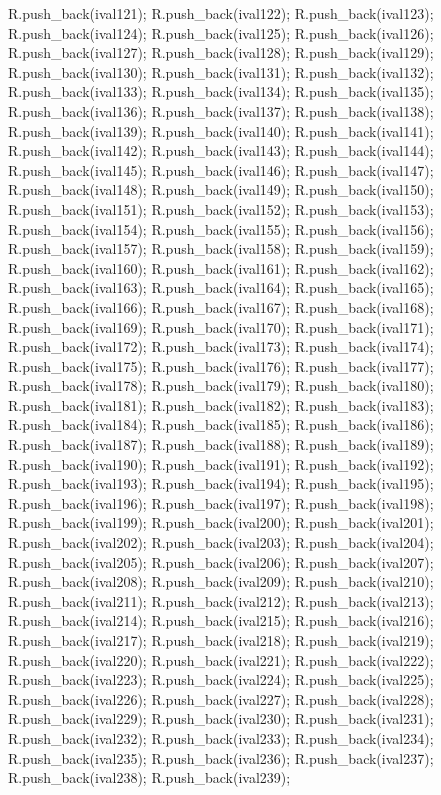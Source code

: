 \begin{DoxyCode}
{R.push_back(ival121);
R.push_back(ival122);
R.push_back(ival123);
R.push_back(ival124);
R.push_back(ival125);
R.push_back(ival126);
R.push_back(ival127);
R.push_back(ival128);
R.push_back(ival129);
R.push_back(ival130);
R.push_back(ival131);
R.push_back(ival132);
R.push_back(ival133);
R.push_back(ival134);
R.push_back(ival135);
R.push_back(ival136);
R.push_back(ival137);
R.push_back(ival138);
R.push_back(ival139);
R.push_back(ival140);
R.push_back(ival141);
R.push_back(ival142);
R.push_back(ival143);
R.push_back(ival144);
R.push_back(ival145);
R.push_back(ival146);
R.push_back(ival147);
R.push_back(ival148);
R.push_back(ival149);
R.push_back(ival150);
R.push_back(ival151);
R.push_back(ival152);
R.push_back(ival153);
R.push_back(ival154);
R.push_back(ival155);
R.push_back(ival156);
R.push_back(ival157);
R.push_back(ival158);
R.push_back(ival159);
R.push_back(ival160);
R.push_back(ival161);
R.push_back(ival162);
R.push_back(ival163);
R.push_back(ival164);
R.push_back(ival165);
R.push_back(ival166);
R.push_back(ival167);
R.push_back(ival168);
R.push_back(ival169);
R.push_back(ival170);
R.push_back(ival171);
R.push_back(ival172);
R.push_back(ival173);
R.push_back(ival174);
R.push_back(ival175);
R.push_back(ival176);
R.push_back(ival177);
R.push_back(ival178);
R.push_back(ival179);
R.push_back(ival180);
R.push_back(ival181);
R.push_back(ival182);
R.push_back(ival183);
R.push_back(ival184);
R.push_back(ival185);
R.push_back(ival186);
R.push_back(ival187);
R.push_back(ival188);
R.push_back(ival189);
R.push_back(ival190);
R.push_back(ival191);
R.push_back(ival192);
R.push_back(ival193);
R.push_back(ival194);
R.push_back(ival195);
R.push_back(ival196);
R.push_back(ival197);
R.push_back(ival198);
R.push_back(ival199);
R.push_back(ival200);
R.push_back(ival201);
R.push_back(ival202);
R.push_back(ival203);
R.push_back(ival204);
R.push_back(ival205);
R.push_back(ival206);
R.push_back(ival207);
R.push_back(ival208);
R.push_back(ival209);
R.push_back(ival210);
R.push_back(ival211);
R.push_back(ival212);
R.push_back(ival213);
R.push_back(ival214);
R.push_back(ival215);
R.push_back(ival216);
R.push_back(ival217);
R.push_back(ival218);
R.push_back(ival219);
R.push_back(ival220);
R.push_back(ival221);
R.push_back(ival222);
R.push_back(ival223);
R.push_back(ival224);
R.push_back(ival225);
R.push_back(ival226);
R.push_back(ival227);
R.push_back(ival228);
R.push_back(ival229);
R.push_back(ival230);
R.push_back(ival231);
R.push_back(ival232);
R.push_back(ival233);
R.push_back(ival234);
R.push_back(ival235);
R.push_back(ival236);
R.push_back(ival237);
R.push_back(ival238);
R.push_back(ival239);
}
\end{DoxyCode}
